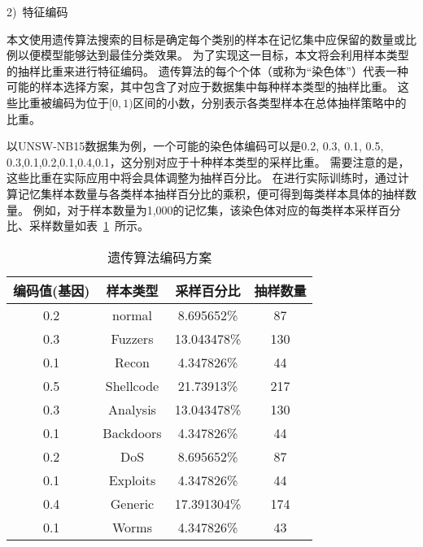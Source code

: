 2)~特征编码\par
本文使用遗传算法搜索的目标是确定每个类别的样本在记忆集中应保留的数量或比例以便模型能够达到最佳分类效果。
为了实现这一目标，本文将会利用样本类型的抽样比重来进行特征编码。
遗传算法的每个个体（或称为“染色体”）代表一种可能的样本选择方案，其中包含了对应于数据集中每种样本类型的抽样比重。
这些比重被编码为位于$[0,1)$区间的小数，分别表示各类型样本在总体抽样策略中的比重。\par
以UNSW-NB15数据集为例，一个可能的染色体编码可以是{0.2, 0.3, 0.1, 0.5, 0.3,0.1,0.2,0.1,0.4,0.1}，这分别对应于十种样本类型的采样比重。
需要注意的是，这些比重在实际应用中将会具体调整为抽样百分比。
在进行实际训练时，通过计算记忆集样本数量与各类样本抽样百分比的乘积，便可得到每类样本具体的抽样数量。
例如，对于样本数量为1,000的记忆集，该染色体对应的每类样本采样百分比、采样数量如表~\ref{tab:Ga_code}~所示。\par
\begin{table}[h]
	\caption{遗传算法编码方案}
	\label{tab:Ga_code}
	\centering
	\begin{tabular}{cccc}
		\toprule
		\textbf{编码值(基因)} & \textbf{样本类型} & \textbf{采样百分比} & \textbf{抽样数量} \\
		\midrule
		0.2                   & normal            & 8.695652\%          & 87                \\
		0.3                   & Fuzzers           & 13.043478\%         & 130               \\
		0.1                   & Recon             & 4.347826\%          & 44                \\
		0.5                   & Shellcode         & 21.73913\%          & 217               \\
		0.3                   & Analysis          & 13.043478\%         & 130               \\
		0.1                   & Backdoors         & 4.347826\%          & 44                \\
		0.2                   & DoS               & 8.695652\%          & 87                \\
		0.1                   & Exploits          & 4.347826\%          & 44                \\
		0.4                   & Generic           & 17.391304\%         & 174               \\
		0.1                   & Worms             & 4.347826\%          & 43                \\
		\bottomrule
	\end{tabular}
\end{table}

